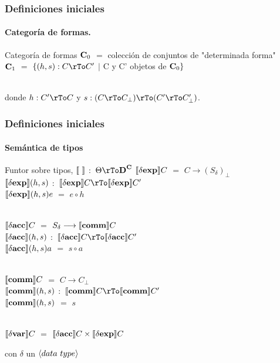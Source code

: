 \documentclass{beamer} %
\begin{document}
\begin{frame}
\frametitle{Definiciones iniciales}
\framesubtitle{Categor\'ia de formas.}

\begin{block}{Categor\'ia de formas}
$\textbf{C}_0$ $=$ colecci\'on de conjuntos de "determinada forma"\\
$\textbf{C}_1$ $=$ $\{(h,s): C \rTo C' $ $|$  C y C' objetos de $\textbf{C}_0 \}$ \\
\

donde $h : C' \rTo C$ y $s : (C \rTo C_\bot) \rTo (C' \rTo C'_\bot)$.\\
\end{block}

\end{frame}

\begin{frame}\small
\frametitle{Definiciones iniciales}
\framesubtitle{Sem\'antica de tipos}

\begin{block}{Funtor sobre tipos, $\semBrcks{ \ }$ $:$ $\Theta \rTo \DC$}
$\llbracket  \delta \textbf{exp}  \rrbracket C$ $=$ $C \longrightarrow (S_{ \delta })_\bot$\\
$\llbracket  \delta \textbf{exp}  \rrbracket(h,s)$ $:$ $\semBrcks{ \deltaexp }C \rTo \semBrcks{ \deltaexp }C'$\\
$\llbracket  \delta \textbf{exp}  \rrbracket(h,s)e$ $=$ $e \circ h$ \\
\

$\llbracket  \delta \textbf{acc}  \rrbracket C$ $=$ $S_{\delta} \longrightarrow \llbracket  \textbf{comm}  \rrbracket C$\\
$\llbracket  \delta \textbf{acc}  \rrbracket(h,s)$ $:$ $\semBrcks{ \deltaacc }C \rTo \semBrcks{ \deltaacc }C'$\\
$\llbracket  \delta \textbf{acc}  \rrbracket(h,s)a$ $=$ $s \circ a$\\
\

$\llbracket  \textbf{comm}  \rrbracket C$ $=$ $C \longrightarrow C_\bot$\\
$\llbracket  \textbf{comm}  \rrbracket(h,s)$ $:$ $\semBrcks{ \commt }C \rTo \semBrcks{ \commt }C'$\\
$\llbracket  \textbf{comm}  \rrbracket(h,s)$ $=$ $s$\\
\

$\llbracket  \delta \textbf{var}  \rrbracket C$ $=$ $\llbracket  \delta \textbf{acc}  \rrbracket C \times  \llbracket  \delta \textbf{exp}  \rrbracket C$\\

\end{block}
con $\delta$ un $\langle data \ type \rangle$

\end{frame}
\end{document}
